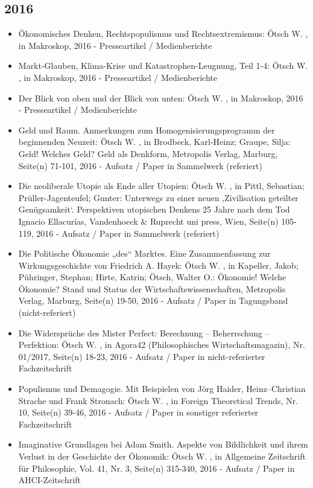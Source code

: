  \subsection{2016} 
 \begin{itemize} 
	 \item Ökonomisches Denken, Rechtspopulismus und Rechtsextremismus: Ötsch W. , in Makroskop, 2016 - Presseartikel / Medienberichte
	 \item Markt-Glauben, Klima-Krise und Katastrophen-Leugnung, Teil 1-4: Ötsch W. , in Makroskop, 2016 - Presseartikel / Medienberichte
	 \item Der Blick von oben und der Blick von unten: Ötsch W. , in Makroskop, 2016 - Presseartikel / Medienberichte
	 \item Geld und Raum. Anmerkungen zum Homogenisierungsprogramm der beginnenden Neuzeit: Ötsch W. , in Brodbeck, Karl-Heinz; Graupe, Silja: Geld! Welches Geld? Geld als Denkform, Metropolis Verlag, Marburg, Seite(n) 71-101, 2016 - Aufsatz / Paper in Sammelwerk (referiert)
	 \item Die neoliberale Utopie als Ende aller Utopien: Ötsch W. , in Pittl, Sebastian; Prüller-Jagenteufel; Gunter: Unterwegs zu einer neuen ‚Zivilisation geteilter Genügsamkeit‘. Perspektiven utopischen Denkens 25 Jahre nach dem Tod Ignacio Ellacurías, Vandenhoeck & Ruprecht uni press, Wien, Seite(n) 105-119, 2016 - Aufsatz / Paper in Sammelwerk (referiert)
	 \item Die Politische Ökonomie „des“ Marktes. Eine Zusammenfassung zur Wirkungsgeschichte von Friedrich A. Hayek: Ötsch W. , in Kapeller, Jakob; Pühringer, Stephan; Hirte, Katrin; Ötsch, Walter O.: Ökonomie! Welche Ökonomie? Stand und Status der Wirtschaftswissenschaften, Metropolis Verlag, Marburg, Seite(n) 19-50, 2016 - Aufsatz / Paper in Tagungsband (nicht-referiert)
	 \item Die Widersprüche des Mister Perfect: Berechnung – Beherrschung – Perfektion: Ötsch W. , in Agora42 (Philosophisches Wirtschaftsmagazin), Nr. 01/2017, Seite(n) 18-23, 2016 - Aufsatz / Paper in nicht-referierter Fachzeitschrift
	 \item Populismus und Demagogie. Mit Beispielen von Jörg Haider, Heinz–Christian Strache und Frank Stronach: Ötsch W. , in Foreign Theoretical Trends, Nr. 10, Seite(n) 39-46, 2016 - Aufsatz / Paper in sonstiger referierter Fachzeitschrift
	 \item Imaginative Grundlagen bei Adam Smith. Aspekte von Bildlichkeit und ihrem Verlust in der Geschichte der Ökonomik: Ötsch W. , in Allgemeine Zeitschrift für Philosophie, Vol. 41, Nr. 3, Seite(n) 315-340, 2016 - Aufsatz / Paper in AHCI-Zeitschrift

\end{itemize}
